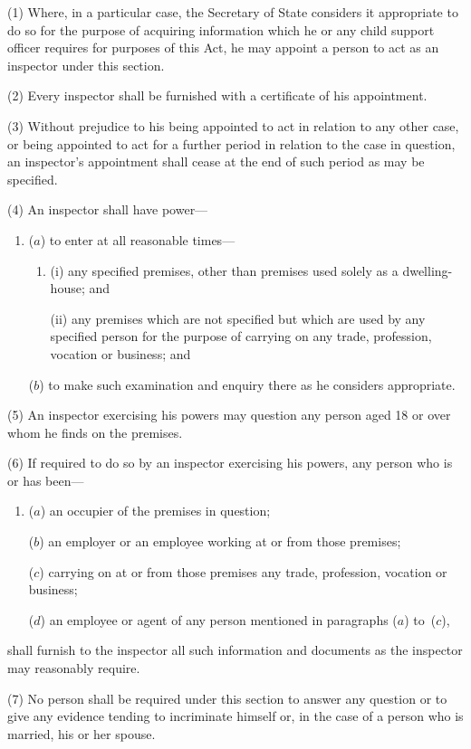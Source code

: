 \documentclass[12pt,a4paper]{article}
\begin{document}
(1) Where, in a particular case, the Secretary of State considers it appropriate to do so for the purpose of acquiring information which he or any child support officer requires for purposes of this Act, he may appoint a person to act as an inspector under this section.

(2) Every inspector shall be furnished with a certificate of his appointment.

(3) Without prejudice to his being appointed to act in relation to any other case, or being appointed to act for a further period in relation to the case in question, an inspector’s appointment shall cease at the end of such period as may be specified.

(4) An inspector shall have power—
\begin{enumerate}\item[]
($a$) to enter at all reasonable times—
\begin{enumerate}\item[]
(i) any specified premises, other than premises used solely as a dwelling-house; and

(ii) any premises which are not specified but which are used by any specified person for the purpose of carrying on any trade, profession, vocation or business; and
\end{enumerate}

($b$) to make such examination and enquiry there as he considers appropriate.
\end{enumerate}

(5) An inspector exercising his powers may question any person aged 18 or over whom he finds on the premises.

(6) If required to do so by an inspector exercising his powers, any person who is or has been—
\begin{enumerate}\item[]
($a$) an occupier of the premises in question;

($b$) an employer or an employee working at or from those premises;

($c$) carrying on at or from those premises any trade, profession, vocation or business;

($d$) an employee or agent of any person mentioned in paragraphs ($a$)  to~($c$),
\end{enumerate}
shall furnish to the inspector all such information and documents as the inspector may reasonably require.

(7) No person shall be required under this section to answer any question or to give any evidence tending to incriminate himself or, in the case of a person who is married, his or her spouse.
\end{document}
